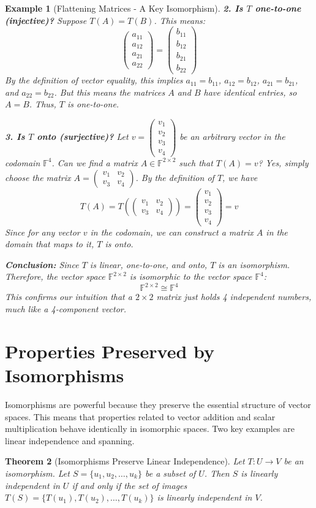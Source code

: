 \documentclass[11pt, letterpaper]{article}
\theoremstyle{mytheoremstyle}
\newtheorem{theorem}{Theorem}[section]
\theoremstyle{mydefinitionstyle}
\newtheorem{example}[theorem]{Example}
\theoremstyle{myremarkstyle}
\newcommand{\F}{\mathbb{F}}
\newcommand{\mat}[1]{\begin{pmatrix}#1\end{pmatrix}} %
\begin{document}
\begin{example}[Flattening Matrices - A Key Isomorphism]
\textbf{2. Is $T$ one-to-one (injective)?}
Suppose $T(A) = T(B)$. This means:
\[ \mat{a_{11} \\ a_{12} \\ a_{21} \\ a_{22}} = \mat{b_{11} \\ b_{12} \\ b_{21} \\ b_{22}} \]
By the definition of vector equality, this implies $a_{11}=b_{11}$, $a_{12}=b_{12}$, $a_{21}=b_{21}$, and $a_{22}=b_{22}$. But this means the matrices $A$ and $B$ have identical entries, so $A = B$.
Thus, $T$ is one-to-one.

\textbf{3. Is $T$ onto (surjective)?}
Let $v = \mat{v_1 \\ v_2 \\ v_3 \\ v_4}$ be an arbitrary vector in the codomain $\F^4$. Can we find a matrix $A \in \F^{2 \times 2}$ such that $T(A) = v$?
Yes, simply choose the matrix $A = \mat{v_1 & v_2 \\ v_3 & v_4}$. By the definition of $T$, we have
\[ T(A) = T\left( \mat{v_1 & v_2 \\ v_3 & v_4} \right) = \mat{v_1 \\ v_2 \\ v_3 \\ v_4} = v \]
Since for any vector $v$ in the codomain, we can construct a matrix $A$ in the domain that maps to it, $T$ is onto.

\textbf{Conclusion:} Since $T$ is linear, one-to-one, and onto, $T$ is an isomorphism. Therefore, the vector space $\F^{2 \times 2}$ is isomorphic to the vector space $\F^4$:
\[ \F^{2 \times 2} \cong \F^4 \]
This confirms our intuition that a $2 \times 2$ matrix just holds 4 independent numbers, much like a 4-component vector.
\end{example}

\section{Properties Preserved by Isomorphisms}

Isomorphisms are powerful because they preserve the essential structure of vector spaces. This means that properties related to vector addition and scalar multiplication behave identically in isomorphic spaces. Two key examples are linear independence and spanning.

\begin{theorem}[Isomorphisms Preserve Linear Independence]
Let $T: U \to V$ be an isomorphism. Let $S = \{u_1, u_2, \dots, u_k\}$ be a subset of $U$. Then $S$ is linearly independent in $U$ if and only if the set of images $T(S) = \{T(u_1), T(u_2), \dots, T(u_k)\}$ is linearly independent in $V$.
\end{theorem}
\end{document}
